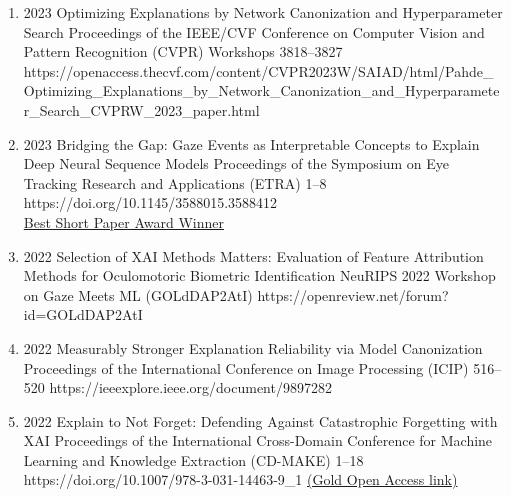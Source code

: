 {\begin{enumerate}
        \item {}
                            {2023}
                            {Optimizing Explanations by Network Canonization and Hyperparameter Search}
                            {Proceedings of the IEEE/CVF Conference on Computer Vision and Pattern Recognition (CVPR) Workshops}
                            {3818--3827}
                            {https://openaccess.thecvf.com/content/CVPR2023W/SAIAD/html/Pahde_Optimizing_Explanations_by_Network_Canonization_and_Hyperparameter_Search_CVPRW_2023_paper.html} 
                            

        \item {}
                            {2023}
                            {Bridging the Gap: Gaze Events as Interpretable Concepts to Explain Deep Neural Sequence Models}
                            {Proceedings of the Symposium on Eye Tracking Research and Applications (ETRA)}
                            {1--8}
                            {https://doi.org/10.1145/3588015.3588412} 
                            {\\\href{https://datacloud.hhi.fraunhofer.de/s/YExo6qyWDxksRof}{Best Short Paper Award Winner}}

        \item {}
                            {2022}
                            {Selection of XAI Methods Matters: Evaluation of Feature Attribution Methods for Oculomotoric Biometric Identification}
                            {NeuRIPS 2022 Workshop on Gaze Meets ML}
                            {(GOLdDAP2AtI)}
                            {https://openreview.net/forum?id=GOLdDAP2AtI} 


        \item {}
                            {2022}
                            {Measurably Stronger Explanation Reliability via Model Canonization}
                            {Proceedings of the International Conference on Image Processing (ICIP)}
                            {516--520}
                            {https://ieeexplore.ieee.org/document/9897282}

        \item {}
                            {2022}
                            {Explain to Not Forget: Defending Against Catastrophic Forgetting with XAI}
                            {Proceedings of the International Cross-Domain Conference for Machine Learning and Knowledge Extraction (CD-MAKE)}
                            {1--18}
                            {https://doi.org/10.1007/978-3-031-14463-9_1}
                            {\href{https://link.springer.com/content/pdf/10.1007/978-3-031-04083-2.pdf}{(Gold Open Access link)}} %


\end{enumerate}}
